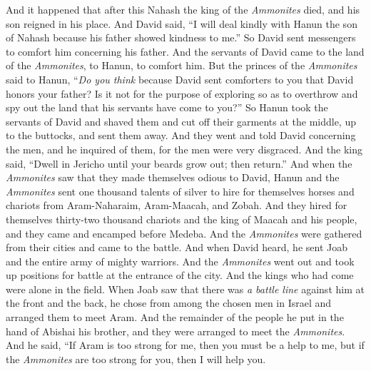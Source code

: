 \begin{biblechapter} %
 And it happened that after this Nahash the king of the \textit{Ammonites} died, and his son reigned in his place.
\verse And David said, “I will deal kindly with Hanun the son of Nahash because his father showed kindness to me.” So David sent messengers to comfort him concerning his father. And the servants of David came to the land of the \textit{Ammonites}, to Hanun, to comfort him.
\verse But the princes of the \textit{Ammonites} said to Hanun, “\textit{Do you think} because David sent comforters to you that David honors your father? Is it not for the purpose of exploring so as to overthrow and spy out the land that his servants have come to you?”
\verse So Hanun took the servants of David and shaved them and cut off their garments at the middle, up to the buttocks, and sent them away.
\verse And they went and told David concerning the men, and he inquired of them, for the men were very disgraced. And the king said, “Dwell in Jericho until your beards grow out; then return.”
\verse And when the \textit{Ammonites} saw that they made themselves odious to David, Hanun and the \textit{Ammonites} sent one thousand talents of silver to hire for themselves horses and chariots from Aram-Naharaim, Aram-Maacah, and Zobah.
\verse And they hired for themselves thirty-two thousand chariots and the king of Maacah and his people, and they came and encamped before Medeba. And the \textit{Ammonites} were gathered from their cities and came to the battle.
\verse And when David heard, he sent Joab and the entire army of mighty warriors.
\verse And the \textit{Ammonites} went out and took up positions for battle at the entrance of the city. And the kings who had come were alone in the field.
\verse When Joab saw that there was \textit{a battle line} against him at the front and the back, he chose from among the chosen men in Israel and arranged them to meet Aram.
\verse And the remainder of the people he put in the hand of Abishai his brother, and they were arranged to meet the \textit{Ammonites}.
\verse And he said, “If Aram is too strong for me, then you must be a help to me, but if the \textit{Ammonites} are too strong for you, then I will help you.

\end{biblechapter}
